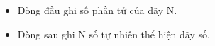 \begin{itemize}
	\item Dòng đầu ghi số phần tử của dãy N.
	\item Dòng sau ghi N số tự nhiên thể hiện dãy số.
\end{itemize}